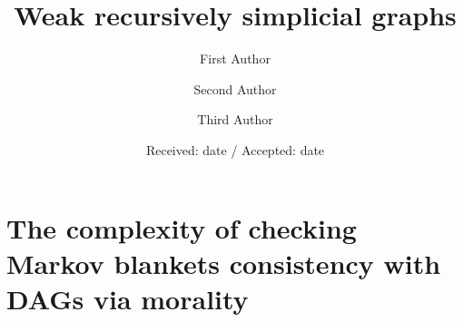 \makeatletter
\newcommand*{\centernot}{%
  \mathpalette\@centernot
}
\def\@centernot#1#2{%
  \mathrel{%
    \rlap{%
      \settowidth\dimen@{$\m@th#1{#2}$}%
      \kern.5\dimen@
      \settowidth\dimen@{$\m@th#1=$}%
      \kern-.5\dimen@
      $\m@th#1\not$%
    }%
    {#2}%
  }%
}
\makeatother

%
%



\title{Weak recursively simplicial graphs
}


\author{First Author         \and
        Second Author \and
        Third Author
}



\date{Received: date / Accepted: date}

\maketitle

\section{The complexity of checking Markov blankets consistency with DAGs via morality}

